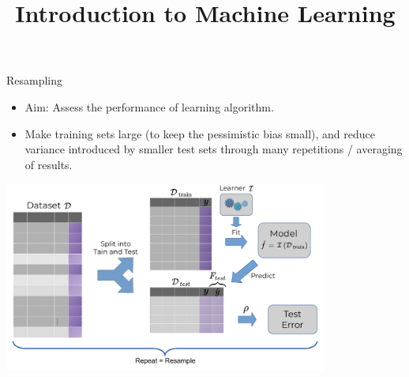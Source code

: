 \documentclass[11pt,compress,t,notes=noshow, xcolor=table]{beamer}
\title{Introduction to Machine Learning}
\institute{\href{https://compstat-lmu.github.io/lecture_i2ml/}{compstat-lmu.github.io/lecture\_i2ml}}
\date{}
\begin{document}

















\begin{vbframe}{Resampling}

\begin{itemize}
  \item Aim: Assess the performance of learning algorithm.
  \item Make training sets large (to keep the pessimistic bias small),
  and reduce variance introduced by smaller test sets through many repetitions / averaging of results.
\end{itemize}

\begin{center}
\includegraphics[width=0.8\textwidth]{figure_man/resampling_error.pdf}
\end{center}

\end{vbframe}
\end{document}
